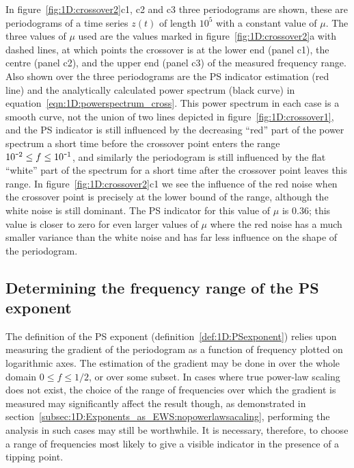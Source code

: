 {{{In figure~\ref{fig:1D:crossover2}c1, c2 and c3 three periodograms are shown, these are periodograms of a time series $z(t)$ of length $10^5$ with a constant value of $\mu$. The three values of $\mu$ used are the values marked in figure~\ref{fig:1D:crossover2}a with dashed lines, at which points the crossover is at the lower end (panel c1), the centre (panel c2), and the upper end (panel c3) of the measured frequency range. Also shown over the three periodograms are the PS indicator estimation (red line) and the analytically calculated power spectrum (black curve) in equation~\ref{eqn:1D:powerspectrum_cross}. This power spectrum in each case is a smooth curve, not the union of two lines depicted in figure~\ref{fig:1D:crossover1}, and the PS indicator is still influenced by the decreasing ``red'' part of the power spectrum a short time before the crossover point enters the range $10^{\textup{\texttt{-}}2}\leq f \leq 10^{\textup{\texttt{-}}1}$, and similarly the periodogram is still influenced by the flat ``white'' part of the spectrum for a short time after the crossover point leaves this range. In figure~\ref{fig:1D:crossover2}c1 we see the influence of the red noise when the crossover point is precisely at the lower bound of the range, although the white noise is still dominant. The PS indicator for this value of $\mu$ is $0.36$; this value is closer to zero for even larger values of $\mu$ where the red noise has a much smaller variance than the white noise and has far less influence on the shape of the periodogram.
}}


\subsection{Determining the frequency range of the PS exponent}
\label{subsec:1D:Exponents_as_EWS:determining_frequency_range}
{\Red
The definition of the PS exponent (definition~\ref{def:1D:PSexponent}) relies upon measuring the gradient of the periodogram as a function of frequency plotted on logarithmic axes. The estimation of the gradient may be done in over the whole domain $0\leq f\leq 1/2$, or over some subset. In cases where true power-law scaling does not exist, the choice of the range of frequencies over which the gradient is measured may significantly affect the result though, as demonstrated in section~\ref{subsec:1D:Exponents_as_EWS:nopowerlawsacaling}, performing the analysis in such cases may still be worthwhile. It is necessary, therefore, to choose a range of frequencies most likely to give a visible indicator in the presence of a tipping point. 

}}
